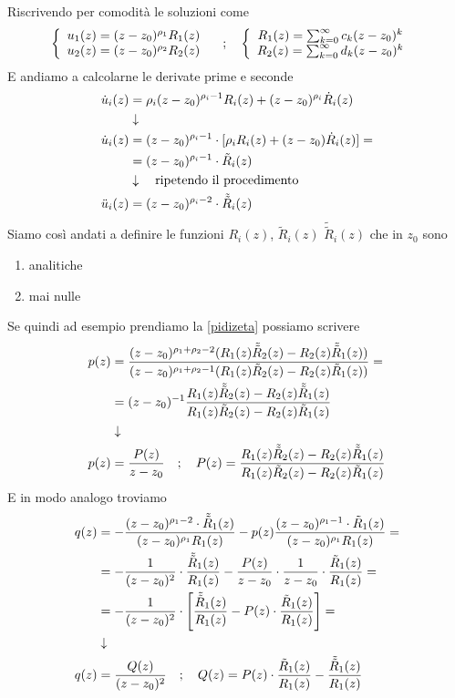 Riscrivendo per comodità le soluzioni come
\begin{align}
	&\left\{ \begin{array}{cc} u_1(z) = (z-z_0)^{\rho_1} R_1(z)\\ u_2(z) = (z-z_0)^{\rho_2}R_2(z)  \end{array} \right. \quad ; \quad \left\{ \begin{array}{cc} R_1(z) = \sum_{k = 0}^{\infty} c_k (z-z_0)^{k} \\  R_2(z) = \sum_{k = 0}^{\infty} d_k (z-z_0)^{k} \end{array} \right.
\end{align}
E andiamo a calcolarne le derivate prime e seconde
\begin{align}
	\dot{u}_i(z) &= \rho_i(z-z_0)^{\rho_i-1} R_i(z) + (z-z_0)^{\rho_i} \dot{R}_i(z)\\ &\downarrow \nonumber \\
	\dot{u}_i(z) &= (z-z_0)^{\rho_i-1}\cdot [\rho_i R_i(z) +(z-z_0)\dot{R}_i(z) ] = \nonumber\\
				 &= (z-z_0)^{\rho_i-1}\cdot \tilde{R}_i(z) \\ &\downarrow \quad \text{ripetendo il procedimento} \nonumber \\
	\ddot{u}_i(z)&= (z-z_0)^{\rho_i-2}\cdot \tilde{\tilde{R}}_i(z)
\end{align}
Siamo così andati a definire le funzioni $R_i(z)$, $\tilde{R}_i(z)$ $\tilde{\tilde{R}}_i(z)$ che in $z_0$ sono
\begin{enumerate}
	\item analitiche 
	\item mai nulle
\end{enumerate}

Se quindi ad esempio prendiamo la \ref{pidizeta} possiamo scrivere
\begin{align}
	p(z) &= \frac{(z-z_0)^{\rho_1 + \rho_2 -2} (R_1(z)\tilde{\tilde{R}}_2(z) - R_2(z)\tilde{\tilde{R}}_1(z))}{(z-z_0)^{\rho_1 + \rho_2 -1} (R_1(z)\tilde{R}_2(z) - R_2(z)\tilde{R}_1(z))} = \nonumber \\
	 	 &=(z-z_0)^{-1} \frac{R_1(z)\tilde{\tilde{R}}_2(z) - R_2(z)\tilde{\tilde{R}}_1(z)}{R_1(z)\tilde{R}_2(z) - R_2(z)\tilde{R}_1(z)} \nonumber \\ &\downarrow \nonumber \\
	p(z) &= \frac{P(z)}{z-z_0} \quad ; \quad P(z) = \frac{R_1(z)\tilde{\tilde{R}}_2(z) - R_2(z)\tilde{\tilde{R}}_1(z)}{R_1(z)\tilde{R}_2(z) - R_2(z)\tilde{R}_1(z)}
\end{align}
E in modo analogo troviamo
\begin{align}
	q(z) &= -\frac{(z-z_0)^{\rho_1-2}\cdot \tilde{\tilde{R}}_1(z)}{(z-z_0)^{\rho_1} R_1(z)} - p(z)\frac{(z-z_0)^{\rho_1-1}\cdot \tilde{R}_1(z)}{(z-z_0)^{\rho_1} R_1(z)} = \nonumber \\
		 &= -\frac{1}{(z-z_0)^{2}} \cdot \frac{\tilde{\tilde{R}}_1(z)}{R_1(z)} - \frac{P(z)}{z-z_0} \cdot \frac{1}{z-z_0} \cdot \frac{\tilde{R}_1(z)}{R_1(z)} = \nonumber \\
		 &=	-\frac{1}{(z-z_0)^{2}} \cdot \left[ \frac{\tilde{\tilde{R}}_1(z)}{R_1(z)} - P(z)\cdot \frac{\tilde{R}_1(z)}{R_1(z)} \right] = \nonumber \\ &\downarrow \nonumber \\
	q(z) &= \frac{Q(z)}{(z-z_0)^2} \quad ; \quad Q(z) = P(z)\cdot \frac{\tilde{R}_1(z)}{R_1(z)} - \frac{\tilde{\tilde{R}}_1(z)}{R_1(z)} 
\end{align}

